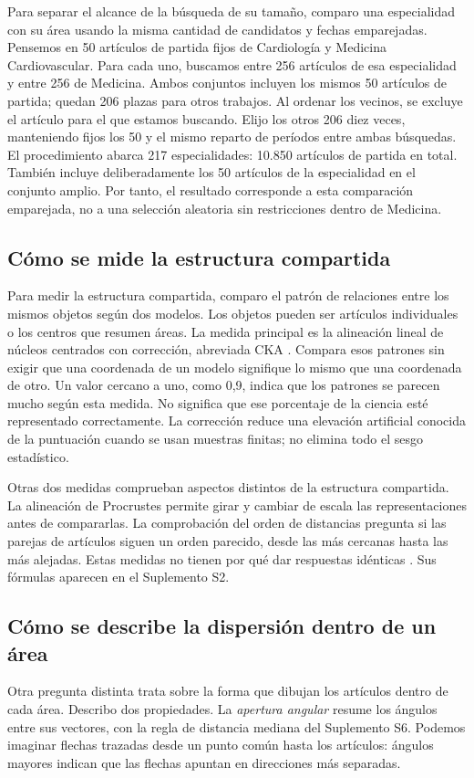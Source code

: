 \documentclass[12pt]{article}
\begin{document}
Para separar el alcance de la búsqueda de su tamaño, comparo una especialidad con su área usando la misma cantidad de candidatos y fechas emparejadas. Pensemos en 50 artículos de partida fijos de Cardiología y Medicina Cardiovascular. Para cada uno, buscamos entre 256 artículos de esa especialidad y entre 256 de Medicina. Ambos conjuntos incluyen los mismos 50 artículos de partida; quedan 206 plazas para otros trabajos. Al ordenar los vecinos, se excluye el artículo para el que estamos buscando. Elijo los otros 206 diez veces, manteniendo fijos los 50 y el mismo reparto de períodos entre ambas búsquedas. El procedimiento abarca 217 especialidades: 10.850 artículos de partida en total. También incluye deliberadamente los 50 artículos de la especialidad en el conjunto amplio. Por tanto, el resultado corresponde a esta comparación emparejada, no a una selección aleatoria sin restricciones dentro de Medicina.

\subsection{Cómo se mide la estructura compartida}
Para medir la estructura compartida, comparo el patrón de relaciones entre los mismos objetos según dos modelos. Los objetos pueden ser artículos individuales o los centros que resumen áreas. La medida principal es la alineación lineal de núcleos centrados con corrección, abreviada CKA \citep{pmlr-v97-kornblith19a,refa961d84a4e}. Compara esos patrones sin exigir que una coordenada de un modelo signifique lo mismo que una coordenada de otro. Un valor cercano a uno, como 0,9, indica que los patrones se parecen mucho según esta medida. No significa que ese porcentaje de la ciencia esté representado correctamente. La corrección reduce una elevación artificial conocida de la puntuación cuando se usan muestras finitas; no elimina todo el sesgo estadístico.

Otras dos medidas comprueban aspectos distintos de la estructura compartida. La alineación de Procrustes permite girar y cambiar de escala las representaciones antes de compararlas. La comprobación del orden de distancias pregunta si las parejas de artículos siguen un orden parecido, desde las más cercanas hasta las más alejadas. Estas medidas no tienen por qué dar respuestas idénticas \citep{NEURIPS2021_252a3dba,pmlr-v285-williams24a}. Sus fórmulas aparecen en el Suplemento S2.

\subsection{Cómo se describe la dispersión dentro de un área}
Otra pregunta distinta trata sobre la forma que dibujan los artículos dentro de cada área. Describo dos propiedades. La \emph{apertura angular} resume los ángulos entre sus vectores, con la regla de distancia mediana del Suplemento S6. Podemos imaginar flechas trazadas desde un punto común hasta los artículos: ángulos mayores indican que las flechas apuntan en direcciones más separadas.
\end{document}
